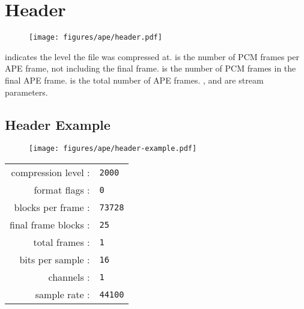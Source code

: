 \clearpage

\section{Header}
\begin{figure}[h]
\texttt{[image: figures/ape/header.pdf]}
\end{figure}
\par
\noindent
{} indicates the level the file was compressed at.
 is the number of PCM frames per APE frame,
not including the final frame.
 is the number of PCM frames
in the final APE frame.
 is the total number of APE frames.
,  and 
are stream parameters.
\subsection{Header Example}
\begin{figure}[h]
\texttt{[image: figures/ape/header-example.pdf]}
\end{figure}
\begin{table}[h]
\begin{tabular}{rl}
compression level : & \texttt{2000} \\
format flags : & \texttt{0} \\
blocks per frame : & \texttt{73728} \\
final frame blocks : & \texttt{25} \\
total frames : & \texttt{1} \\
bits per sample : & \texttt{16} \\
channels : & \texttt{1} \\
sample rate : & \texttt{44100} \\
\end{tabular}
\end{table}
